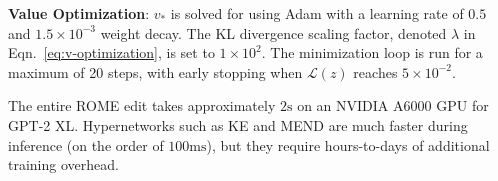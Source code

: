 \textbf{Value Optimization}: $v_*$ is solved for using Adam with a learning rate of $0.5$ and $1.5\times 10^{-3}$ weight decay. The KL divergence scaling factor, denoted $\lambda$ in Eqn.~\ref{eq:v-optimization}, is set to $1\times 10^{2}$. The minimization loop is run for a maximum of 20 steps, with early stopping when $\mathcal{L}(z)$ reaches $5\times 10^{-2}$.

The entire ROME edit takes approximately $2\mathrm{s}$ on an NVIDIA A6000 GPU for GPT-2 XL. Hypernetworks such as KE and MEND are much faster during inference (on the order of $100\mathrm{ms}$), but they require hours-to-days of additional training overhead.